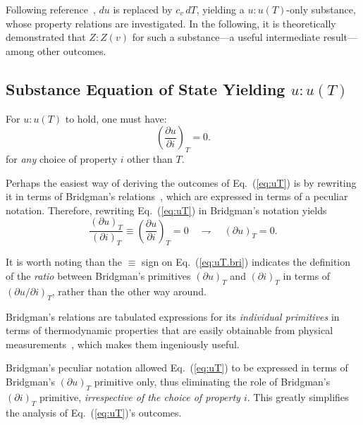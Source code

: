 \documentclass[fleqn,11pt]{SelfArx}
\newcommand{\parxyz}[3]{\left(\frac{\partial {{#1}}}{\partial {{#2}}}\right)_{\!\!\!{#3}}}
\newcommand{\inlxyz}[3]{({\partial {{#1}}}/{\partial {{#2}}})_{{#3}}}
\newcommand{\bri}[2]{(\partial {{#1}})_{{#2}}}
\begin{document}
    Following reference~\cite{2012-ChristiansJ-IntJMechEngEduc}, $du$ is replaced by  $c_v\,dT$,
    yielding a $u\!:\!u(T)$-only substance, whose property relations are  investigated.  In  the
    following, it is theoretically demonstrated  that  $Z\!:\!Z(v)$  for  such  a  substance---a
    useful intermediate result---among other outcomes.

    \subsection{Substance Equation of State Yielding $u\!:\!u(T)$}\label{sec:subst.eos}

    For $u\!:\!u(T)$ to hold, one must have:
    \begin{equation}
        \parxyz uiT = 0.
        \label{eq:uT}
    \end{equation}
    \noindent for \emph{any} choice of property $i$ other than $T$.

    Perhaps the easiest way of deriving the outcomes of Eq.~(\ref{eq:uT}) is by rewriting it  in
    terms of Bridgman's relations~\cite{2006-BejanA-Wiley}, which are expressed in  terms  of  a
    peculiar notation. Therefore, rewriting Eq.~(\ref{eq:uT}) in Bridgman's notation yields
    \begin{equation}
        \frac{\bri uT}{\bri iT} \equiv \parxyz uiT = 0 \quad\rightharpoondown\quad \bri uT = 0.
        \label{eq:uT.bri}
    \end{equation}

    It is worth noting than the $\equiv$ sign on Eq.~(\ref{eq:uT.bri}) indicates the  definition
    of the \emph{ratio} between Bridgman's primitives $\bri  uT$  and  $\bri  iT$  in  terms  of
    $\inlxyz uiT$, rather than the other way around.

    Bridgman's relations are tabulated expressions for its \emph{individual primitives} in terms
    of    thermodynamic    properties    that    are    easily    obtainable    from    physical
    measurements~\cite{2006-BejanA-Wiley}, which makes them ingeniously useful.

    Bridgman's  peculiar  notation  allowed  Eq.~(\ref{eq:uT})  to  be  expressed  in  terms  of
    Bridgman's $\bri uT$ primitive only, thus eliminating  the  role  of  Bridgman's  $\bri  iT$
    primitive, \emph{irrespective of the choice of property $i$}. This  greatly  simplifies  the
    analysis of Eq.~(\ref{eq:uT})'s outcomes.
\end{document}
